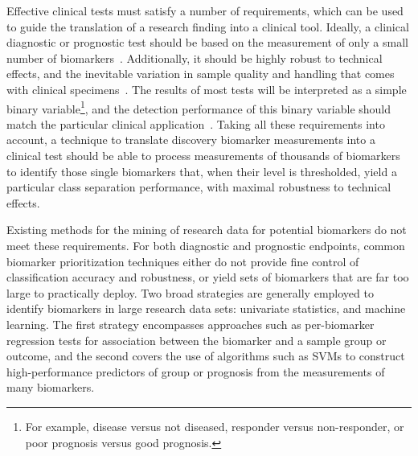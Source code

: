 \documentclass[dissertation.tex]{subfiles}
\begin{document}
Effective clinical tests must satisfy a number of requirements, which can be used to guide the translation of a research finding into a clinical tool.  Ideally, a clinical diagnostic or prognostic test should be based on the measurement of only a small number of biomarkers~\cite{Lesko2001, Pepe2001}.  Additionally, it should be highly robust to technical effects, and the inevitable variation in sample quality and handling that comes with clinical specimens~\cite{Hewitt2008}.  The results of most tests will be interpreted as a simple binary variable\footnote{For example, disease versus not diseased, responder versus non-responder, or poor prognosis versus good prognosis.}, and the detection performance of this binary variable should match the particular clinical application~\cite{Pepe2001}.  Taking all these requirements into account, a technique to translate discovery biomarker measurements into a clinical test should be able to process measurements of thousands of biomarkers to identify those single biomarkers that, when their level is thresholded, yield a particular class separation performance, with maximal robustness to technical effects.

Existing methods for the mining of research data for potential biomarkers do not meet these requirements.  For both diagnostic and prognostic endpoints, common biomarker prioritization techniques either do not provide fine control of classification accuracy and robustness, or yield sets of biomarkers that are far too large to practically deploy.  Two broad strategies are generally employed to identify biomarkers in large research data sets: univariate statistics, and machine learning.  The first strategy encompasses approaches such as per-biomarker regression tests for association between the biomarker and a sample group or outcome, and the second covers the use of algorithms such as \glspl{SVM} to construct high-performance predictors of group or prognosis from the measurements of many biomarkers.
\end{document}

